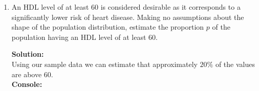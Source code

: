 \documentclass[12pt]{article}
\makeatletter
\theoremstyle{homework}
\newenvironment{exercise}[1]
{\def\@currentlabel{#1}\exercisecore}
{\endexercisecore}
\newcommand{\localhead}[1]{\par\smallskip\noindent\textbf{#1}\nobreak\\}%
\newcommand\solution{\localhead{Solution:}}
\makeatother
\begin{document}
\begin{exercise}{6.2}
\begin{enumerate}
\item An HDL level of at least 60 is considered desirable as it corresponds to a significantly lower risk 
of heart disease.  Making  no  assumptions  about  the  shape  of  the population distribution, estimate the
 proportion $p$ of the population having an HDL level of at least 60.\\
 \solution Using our sample data we can estimate that approximately $20\%$ of the values are above 60.\\ 

 \textbf{Console:}
 \begin{center}
   
 \end{center}
\end{enumerate}
\end{exercise}
\vspace{.5in}
\end{document}

